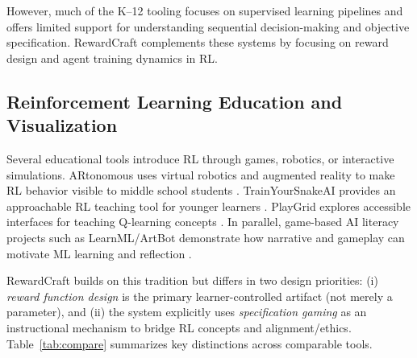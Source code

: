 \documentclass[conference]{IEEEtran}
\begin{document}
However, much of the K--12 tooling focuses on supervised learning pipelines and offers limited support for understanding sequential decision-making and objective specification. RewardCraft complements these systems by focusing on reward design and agent training dynamics in RL.

\subsection{Reinforcement Learning Education and Visualization}
Several educational tools introduce RL through games, robotics, or interactive simulations. ARtonomous uses virtual robotics and augmented reality to make RL behavior visible to middle school students \cite{dietz2022}. TrainYourSnakeAI provides an approachable RL teaching tool for younger learners \cite{hinojosa2025}. PlayGrid explores accessible interfaces for teaching Q-learning concepts \cite{quiloan2023}. In parallel, game-based AI literacy projects such as LearnML/ArtBot demonstrate how narrative and gameplay can motivate ML learning and reflection \cite{voulgari2021,zammit2022}.

RewardCraft builds on this tradition but differs in two design priorities: (i) \emph{reward function design} is the primary learner-controlled artifact (not merely a parameter), and (ii) the system explicitly uses \emph{specification gaming} as an instructional mechanism to bridge RL concepts and alignment/ethics. Table~\ref{tab:compare} summarizes key distinctions across comparable tools.
\end{document}
